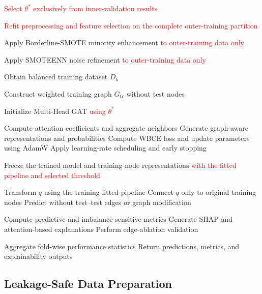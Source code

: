 \documentclass[pdflatex,sn-mathphys-num]{sn-jnl}%
\theoremstyle{thmstyleone}%
\theoremstyle{thmstyletwo}%
\theoremstyle{thmstylethree}%
\begin{document}
\begin{algorithm}[!ht]
\begin{algorithmic}[1]
    \State \textcolor{red}{
    Select \(\theta^{*}\) exclusively from inner-validation results
    }

    \State \textcolor{red}{
    Refit preprocessing and feature selection on the complete
    outer-training partition
    }

    \State Apply Borderline-SMOTE minority enhancement
    \textcolor{red}{to outer-training data only}

    \State Apply SMOTEENN noise refinement
    \textcolor{red}{to outer-training data only}

    \State Obtain balanced training dataset \(D_b\)

    \State Construct weighted training graph
    \(G_{\mathrm{tr}}\) without test nodes

    \State Initialize Multi-Head GAT
    \textcolor{red}{using \(\theta^{*}\)}


        \State Compute attention coefficients and aggregate neighbors
        \State Generate graph-aware representations and probabilities
        \State Compute WBCE loss and update parameters using AdamW
        \State Apply learning-rate scheduling and early stopping

    \EndFor

    \State Freeze the trained model and training-node representations
    \textcolor{red}{with the fitted pipeline and selected threshold}


        \State Transform \(q\) using the training-fitted pipeline
        \State Connect \(q\) only to original training nodes
        \State Predict without test--test edges or graph modification

    \EndFor

    \State Compute predictive and imbalance-sensitive metrics
    \State Generate SHAP and attention-based explanations
    \State Perform edge-ablation validation

\EndFor

\State Aggregate fold-wise performance statistics
\State Return predictions, metrics, and explainability outputs

\end{algorithmic}
\end{algorithm}
\subsection{Leakage-Safe Data Preparation}
\label{subsec:data_preparation}
\end{document}
